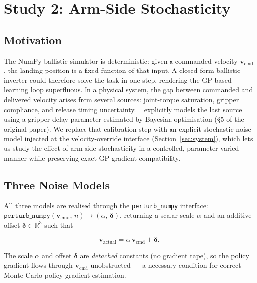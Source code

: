 \section{Study 2: Arm-Side Stochasticity}
\label{sec:study2}

\subsection{Motivation}
\label{sec:study2:motivation}

The NumPy ballistic simulator is deterministic: given a commanded velocity
$\mathbf{v}_{\mathrm{cmd}}$, the landing position is a fixed function of that input.
A closed-form ballistic inverter could therefore solve the task in one step,
rendering the GP-based learning loop superfluous.
In a physical system, the gap between commanded and delivered velocity arises from
several sources: joint-torque saturation, gripper compliance, and release timing
uncertainty.
\mcpilot{}~\cite{turcato2025mcpilot} explicitly models the last source using a
gripper delay parameter estimated by Bayesian optimisation (\S5 of the original paper).
We replace that calibration step with an explicit stochastic noise model injected at
the velocity-override interface (Section~\ref{sec:system}), which lets us study the
effect of arm-side stochasticity in a controlled, parameter-varied manner while
preserving exact GP-gradient compatibility.

\subsection{Three Noise Models}
\label{sec:study2:models}

All three models are realised through the \texttt{perturb\_numpy} interface:
$\texttt{perturb\_numpy}(\mathbf{v}_{\mathrm{cmd}},\, n) \to (\alpha,\, \boldsymbol{\delta})$,
returning a scalar scale $\alpha$ and an additive offset $\boldsymbol{\delta} \in \mathbb{R}^3$
such that

\begin{equation}
  \mathbf{v}_{\mathrm{actual}} = \alpha\,\mathbf{v}_{\mathrm{cmd}} + \boldsymbol{\delta}.
  \label{eq:perturb_interface}
\end{equation}

The scale $\alpha$ and offset $\boldsymbol{\delta}$ are \emph{detached} constants
(no gradient tape), so the policy gradient flows through $\mathbf{v}_{\mathrm{cmd}}$
unobstructed — a necessary condition for correct Monte Carlo policy-gradient
estimation.

